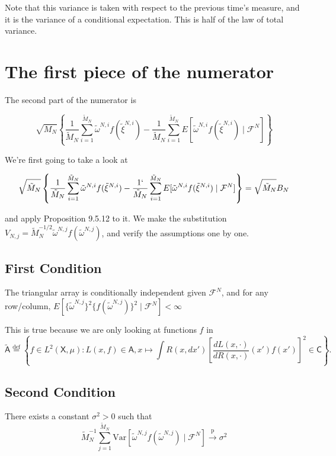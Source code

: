 \documentclass{article}
\begin{document}
Note that this variance is taken with respect to the previous time's measure, and it is the variance of a conditional expectation. This is half of the law of total variance.

\section{The first piece of the numerator}

The second part of the numerator is 

$$
\sqrt{M_N}\left\{  \frac{1}{\tilde{M}_N} \sum_{i=1}^{\tilde{M}_N} \tilde{\omega}^{N,i} f(\tilde{\xi}^{N,i}) -  \frac{1}{\tilde{M}_N} \sum_{i=1}^{\tilde{M}_N} E[ \tilde{\omega}^{N,i} f(\tilde{\xi}^{N,i}) \mid \mathcal{F}^N] \right\}
$$

We're first going to take a look at 

$$
\sqrt{\tilde{M}_N}\left\{  \frac{1}{\tilde{M}_N} \sum_{i=1}^{\tilde{M}_N} \tilde{\omega}^{N,i} f(\tilde{\xi}^{N,i}) -  \frac{1`}{\tilde{M}_N} \sum_{i=1}^{\tilde{M}_N} E[ \tilde{\omega}^{N,i} f(\tilde{\xi}^{N,i}) \mid \mathcal{F}^N] \right\} = \sqrt{\tilde{M}_N} B_N
$$

and apply Proposition 9.5.12 to it. We make the substitution $V_{N,j} = \tilde{M}_N^{-1/2} \tilde{\omega}^{N,j} f(\tilde{\omega}^{N,j})$, and verify the assumptions one by one. 
\newline

\subsection{First Condition}


The triangular array is conditionally independent given $\mathcal{F}^N$, and for any row/column, $E[ \{\tilde{\omega}^{N,j}\}^2 \{f(\tilde{\omega}^{N,j})\}^2 \mid \mathcal{F}^N] < \infty$

This is true because we are only looking at functions $f$ in 
$$
\tilde{\mathsf{A}} \overset{\text{def}}{=} \left\{ f \in L^2(\mathsf{X}, \mu) : L(x,f) \in \mathsf{A}, x \mapsto \int R(x,dx')\left[ \frac{dL(x,\cdot)}{dR(x,\cdot)}(x') f(x') \right]^2 \in \mathsf{C} \right\}.
$$



\subsection{Second Condition}

There exists a constant $\sigma^2 >0$ such that
$$
\tilde{M}_N^{-1}\sum_{j=1}^{\tilde{M}_N} \text{Var}\left[  \tilde{\omega}^{N,j} f(\tilde{\omega}^{N,j})  \mid \mathcal{F}^N \right] \overset{\text{p}}{\to} \sigma^2
$$
\end{document}
